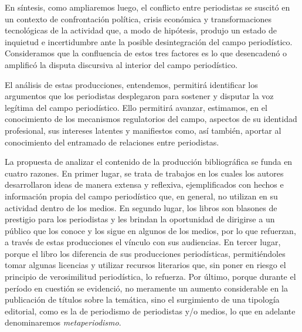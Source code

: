 En síntesis, como ampliaremos luego, el conflicto entre periodistas se suscitó en un contexto de confrontación política, crisis económica y transformaciones tecnológicas de la actividad que, a modo de hipótesis, produjo un estado de inquietud e incertidumbre ante la posible desintegración del campo periodístico. Consideramos que la confluencia de estos tres factores es lo que desencadenó o amplificó la disputa discursiva al interior del campo periodístico.

El análisis de estas producciones, entendemos, permitirá identificar los argumentos que los periodistas desplegaron para sostener y disputar la voz legítima del campo periodístico. Ello permitirá avanzar, estimamos, en el conocimiento de los mecanismos regulatorios del campo, aspectos de su identidad profesional, sus intereses latentes y manifiestos como, así también, aportar al conocimiento del entramado de relaciones entre periodistas.

La propuesta de analizar el contenido de la producción bibliográfica se funda en cuatro razones. En primer lugar, se trata de trabajos en los cuales los autores desarrollaron ideas de manera extensa y reflexiva, ejemplificados con hechos e información propia del campo periodístico que, en general, no utilizan en su actividad dentro de los medios. En segundo lugar, los libros son blasones de prestigio para los periodistas y les brindan la oportunidad de dirigirse a un público que los conoce y los sigue en algunos de los medios, por lo que refuerzan, a través de estas producciones el vínculo con sus audiencias. En tercer lugar, porque el libro los diferencia de sus producciones periodísticas, permitiéndoles tomar algunas licencias y utilizar recursos literarios que, sin poner en riesgo el principio de verosimilitud periodística, lo refuerza. Por último, porque durante el período en cuestión se evidenció, no meramente un aumento considerable en la publicación de títulos sobre la temática, sino el surgimiento de una tipología editorial, como es la de periodismo de periodistas y/o medios, lo que en adelante denominaremos \emph{metaperiodismo}.

